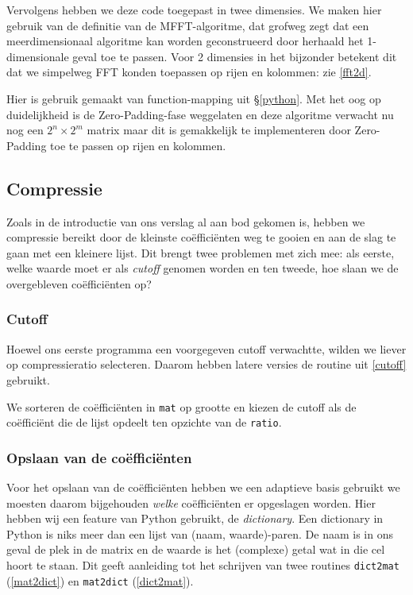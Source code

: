 Vervolgens hebben we deze code toegepast in twee dimensies. We maken hier gebruik van de definitie van de
MFFT-algoritme, dat grofweg zegt dat een meerdimensionaal algoritme kan worden geconstrueerd door herhaald 
het 1-dimensionale geval toe te passen. Voor 2 dimensies in het bijzonder betekent dit dat we simpelweg 
FFT konden toepassen op rijen en kolommen: zie \autoref{fft2d}.

Hier is gebruik gemaakt van function-mapping uit \S \ref{python}.
Met het oog op duidelijkheid is de Zero-Padding-fase weggelaten en
deze algoritme verwacht nu nog een $2^n \times 2^m$ matrix maar dit is gemakkelijk te implementeren door Zero-Padding toe te passen op rijen en kolommen.

\subsection{Compressie}
Zoals in de introductie van ons verslag al aan bod gekomen is, hebben we compressie bereikt door de kleinste 
co\"effici\"enten weg te gooien en aan de slag te gaan met een kleinere lijst. 
Dit brengt twee problemen met zich mee: als eerste, welke waarde moet er als \emph{cutoff} genomen worden en ten tweede, hoe slaan we de overgebleven co\"effici\"enten op?

\subsubsection{Cutoff}
Hoewel ons eerste programma een voorgegeven cutoff verwachtte, wilden we liever op compressieratio selecteren.
Daarom hebben latere versies de routine uit \autoref{cutoff} gebruikt. 

We sorteren de co\"effici\"enten in \texttt{mat} op grootte en kiezen de cutoff als de co\"effici\"ent
die de lijst opdeelt ten opzichte van de \texttt{ratio}.

\subsubsection{Opslaan van de co\"effici\"enten}
Voor het opslaan van de co\"effici\"enten hebben we een adaptieve basis gebruikt
we moesten daarom bijgehouden \emph{welke} co\"effici\"enten er opgeslagen worden. 
Hier hebben wij een feature van Python gebruikt, de \emph{dictionary}.
Een dictionary in Python is niks meer dan een lijst van (naam, waarde)-paren. 
De naam is in ons geval de plek in de matrix en de waarde is het (complexe) getal wat in die cel hoort te staan. 
Dit geeft aanleiding tot het schrijven van twee routines \texttt{dict2mat} (\autoref{mat2dict}) en \texttt{mat2dict} (\autoref{dict2mat}).

